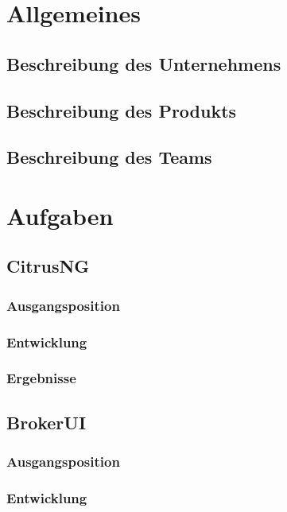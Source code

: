 \documentclass{article}
\begin{document}
    \section{Allgemeines}

    \subsection{Beschreibung des Unternehmens}

    \subsection{Beschreibung des Produkts}

    \subsection{Beschreibung des Teams}

    \section{Aufgaben}

    \subsection{CitrusNG}

    \subsubsection{Ausgangsposition}

    \subsubsection{Entwicklung}

    \subsubsection{Ergebnisse}

    \subsection{BrokerUI}

    \subsubsection{Ausgangsposition}

    \subsubsection{Entwicklung}
\end{document}
